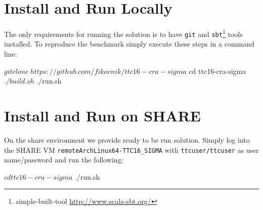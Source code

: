 
\section{Install and Run Locally}
\label{sec:InstallLocally}

The only requirements for running the solution is to have \texttt{git} and \texttt{sbt}\footnote{simple-built-tool \Cf \url{http://www.scala-sbt.org/}} tools installed.
To reproduce the benchmark simply execute these steps in a command line:

\begin{bashcode}
$ git clone \
  https://github.com/fikovnik/ttc16-cra-sigma
$ cd ttc16-cra-sigma
$ ./build.sh
$ ./run.sh
\end{bashcode}

\section{Install and Run on SHARE}
\label{sec:InstallSHARE}

On the share environment we provide ready to be run solution. Simply log into the SHARE VM \texttt{remoteArchLinux64-TTC16\_SIGMA} with \texttt{ttcuser/ttcuser} as user name/password and run the following:

\begin{bashcode}
$ cd ttc16-cra-sigma
$ ./run.sh
\end{bashcode}